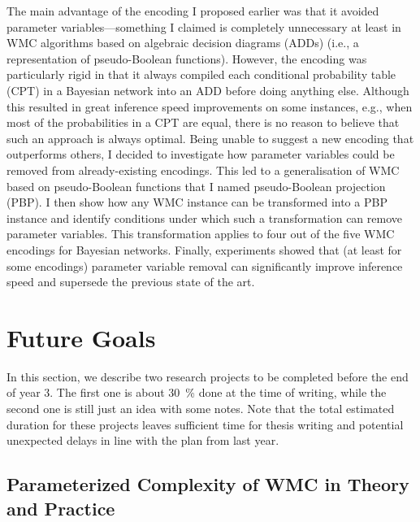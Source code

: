 \documentclass{article}
\begin{document}
\begin{description}
  The main advantage of the encoding I proposed earlier was that it avoided
  parameter variables---something I claimed is completely unnecessary at
  least in WMC algorithms based on algebraic decision diagrams (ADDs) (i.e., a
  representation of pseudo-Boolean functions). However, the encoding was
  particularly rigid in that it always compiled each conditional probability
  table (CPT) in a Bayesian network into an ADD before doing anything else.
  Although this resulted in great inference speed improvements on some
  instances, e.g., when most of the probabilities in a CPT are equal, there is
  no reason to believe that such an approach is always optimal. Being unable to
  suggest a new encoding that outperforms others, I decided to investigate how
  parameter variables could be removed from already-existing encodings. This led
  to a generalisation of WMC based on pseudo-Boolean functions that I named
  pseudo-Boolean projection (PBP). I then show how any WMC instance can be
  transformed into a PBP instance and identify conditions under which such a
  transformation can remove parameter variables. This transformation applies to
  four out of the five WMC encodings for Bayesian networks. Finally, experiments
  showed that (at least for some encodings) parameter variable removal can
  significantly improve inference speed and supersede the previous state of the
  art.
\end{description}

\section{Future Goals} \label{sec:future}

In this section, we describe two research projects to be completed before the
end of year 3. The first one is about \SI{30}{\percent} done at the time of
writing, while the second one is still just an idea with some notes. Note that
the total estimated duration for these projects leaves sufficient time for
thesis writing and potential unexpected delays in line with the plan from last
year.

\subsection{Parameterized Complexity of WMC in Theory and
  Practice} \label{sec:1}
\end{document}
